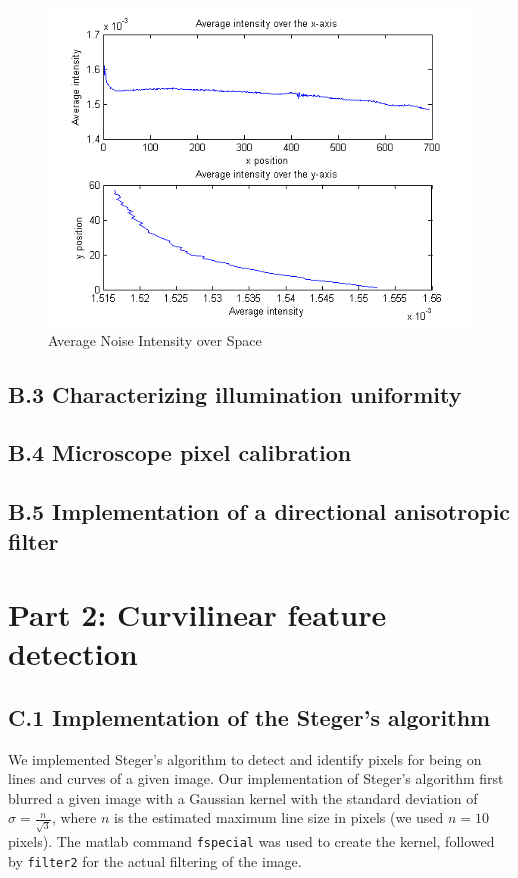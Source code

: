 \documentclass{article}
\begin{document}
\begin{figure}[t]
\centering
\includegraphics[width=0.45\linewidth]{figures/noise_intensity_over_space.png}
\caption{Average Noise Intensity over Space}
\label{fig:noise_intensity_space}
\end{figure}


\subsection*{B.3 Characterizing illumination uniformity}



\subsection*{B.4 Microscope pixel calibration}
 


\subsection*{B.5 Implementation of a directional anisotropic filter}



\pagebreak
\section*{Part 2: Curvilinear feature detection}

\subsection*{C.1 Implementation of the Steger's algorithm}

We implemented Steger's algorithm to detect and identify pixels for being on lines and curves of a given image. Our implementation of Steger's algorithm first blurred a given image with a Gaussian kernel with the standard deviation of $\sigma = \frac{n}{\sqrt{3}}$, where $n$ is the estimated maximum line size in pixels (we used $n = 10$ pixels). The matlab command \texttt{fspecial} was used 
to create the kernel, followed by \texttt{filter2} for the actual filtering of the image.
\end{document}
